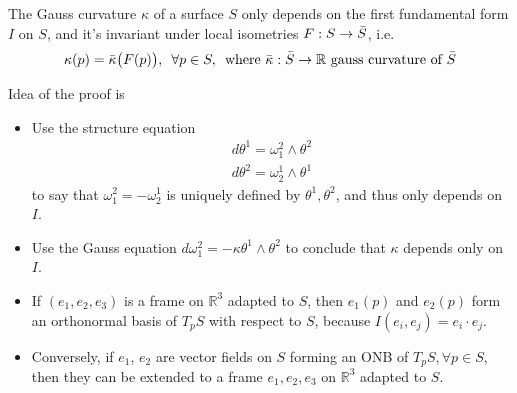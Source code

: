 \documentclass[10pt]{article}
\begin{document}
            \begin{theorem}
                The Gauss curvature $\kappa$ of a surface $S$ only depends on the first fundamental form $I$ on $S$, and it's invariant under local isometries $F: S\rightarrow\Bar{S}$, i.e.
                \begin{equation*}
                    \begin{aligned}
                        \kappa(p) = \Bar{\kappa}\big(F(p)\big),\thinspace\thinspace\thinspace\forall p\in S,\thinspace\thinspace\thinspace \text{where}\thinspace\thinspace \Bar{\kappa}: \Bar{S}\rightarrow\mathbb{R} \thinspace\thinspace\text{gauss curvature of} \thinspace\thinspace\Bar{S}
                    \end{aligned}
                \end{equation*}
            \end{theorem}
            Idea of the proof is 
            \begin{itemize}
                \item Use the structure equation
                    \begin{equation*}
                        \begin{aligned}
                            d\theta^1 = \omega_1^2\wedge\theta^2 \\
                            d\theta^2 = \omega_2^1\wedge\theta^1
                        \end{aligned}
                    \end{equation*}
                    to say that $\omega_1^2=-\omega_2^1$ is uniquely defined by $\theta^1, \theta^2$, and thus only depends on $I$.
                \item Use the Gauss equation $d\omega_1^2 = -\kappa\theta^1\wedge\theta^2$ to conclude that $\kappa$ depends only on $I$.
            \end{itemize}
            \begin{lemma}
                \begin{itemize}
                    \item If $(e_1, e_2, e_3)$ is a frame on $\mathbb{R}^3$ adapted to $S$, then $e_1(p)$ and $e_2(p)$ form an orthonormal basis of $T_pS$ with respect to $S$, because $I(e_i, e_j) = e_i\cdot e_j$.
                    \item Conversely, if $e_1$, $e_2$ are vector fields on $S$ forming an ONB of $T_pS,\forall p\in S$, then they can be extended to a frame $e_1, e_2, e_3$ on $\mathbb{R}^3$ adapted to $S$. 
                \end{itemize}
            \end{lemma}
\end{document}

